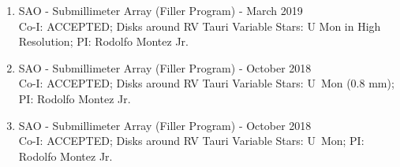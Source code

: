 \documentclass[letter,11pt]{article}
\begin{document}
\begin{enumerate}[\bfseries 1.]
\item SAO - Submillimeter Array (Filler Program) - March 2019 \\
Co-I: ACCEPTED; Disks around RV Tauri Variable Stars: U Mon in High Resolution; PI: Rodolfo Montez Jr.

\item SAO - Submillimeter Array (Filler Program) - October 2018 \\
Co-I: ACCEPTED; Disks around RV Tauri Variable Stars: U~Mon (0.8 mm); PI: Rodolfo Montez Jr.






\item SAO - Submillimeter Array (Filler Program) - October 2018 \\
Co-I: ACCEPTED; Disks around RV Tauri Variable Stars: U~Mon; PI: Rodolfo Montez Jr.



\end{enumerate}
\end{document}
